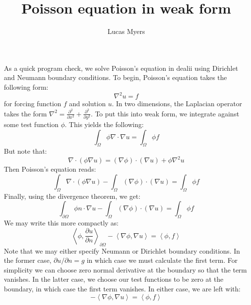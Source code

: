 \documentclass[reqno]{article}
\begin{document}
	\title{Poisson equation in weak form}
	\author{Lucas Myers}
	\maketitle
	
	As a quick program check, we solve Poisson's equation in dealii using Dirichlet and Neumann boundary conditions.
	To begin, Poisson's equation takes the following form:
	\begin{equation}
		\nabla^2 u = f
	\end{equation}
	for forcing function $f$ and solution $u$.
	In two dimensions, the Laplacian operator takes the form $\nabla^2 = \frac{\partial^2}{\partial x^2} + \frac{\partial^2}{\partial y^2}$.
	To put this into weak form, we integrate against some test function $\phi$.
	This yields the following:
	\begin{equation}
		\int_\Omega \phi \nabla \cdot \nabla u = \int_\Omega \phi f
	\end{equation}
	But note that:
	\begin{equation}
		\nabla \cdot (\phi \nabla u) 
		= (\nabla \phi)\cdot (\nabla u) + \phi \nabla^2 u
	\end{equation}
	Then Poisson's equation reads:
	\begin{equation}
		\int_\Omega \nabla \cdot (\phi \nabla u) 
		- \int_\Omega (\nabla \phi)\cdot (\nabla u)
		= \int_\Omega \phi f
	\end{equation}
	Finally, using the divergence theorem, we get:
	\begin{equation}
		\int_{\partial \Omega} \phi n\cdot \nabla u
		- \int_\Omega (\nabla \phi) \cdot (\nabla u)
		= \int_\Omega \phi f
	\end{equation}
	We may write this more compactly as:
	\begin{equation}
		\left<\phi, \frac{\partial u}{\partial n} \right>_{\partial \Omega}
		- \left<\nabla \phi, \nabla u\right>
		= \left< \phi, f \right>
	\end{equation}
	Note that we may either specify Neumann or Dirichlet boundary conditions. 
	In the former case, $\partial u / \partial n = g$ in which case we must calculate the first term.
	For simplicity we can choose zero normal derivative at the boundary so that the term vanishes.
	In the latter case, we choose our test functions to be zero at the boundary, in which case the first term vanishes.
	In either case, we are left with:
	\begin{equation}
		- \left<\nabla \phi, \nabla u\right>
		= \left< \phi, f \right>
	\end{equation}
\end{document}
